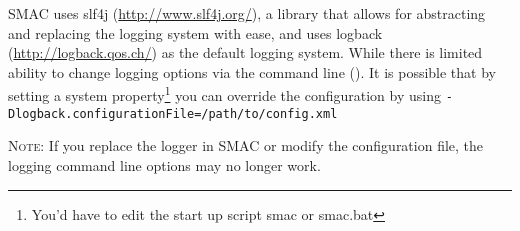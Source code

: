 	SMAC uses slf4j (\url{http://www.slf4j.org/}), a library that allows for abstracting and replacing the logging system with ease, and uses logback (\url{http://logback.qos.ch/}) as the default logging system. While there is limited ability to change logging options via the command line (). It is possible that by setting a system property\footnote{You'd have to edit the start up script smac or smac.bat}  you can override the configuration by using \texttt{-Dlogback.configurationFile=/path/to/config.xml}

	
	\textsc{Note:} If you replace the logger in SMAC or modify the configuration file, the logging command line options may no longer work.
